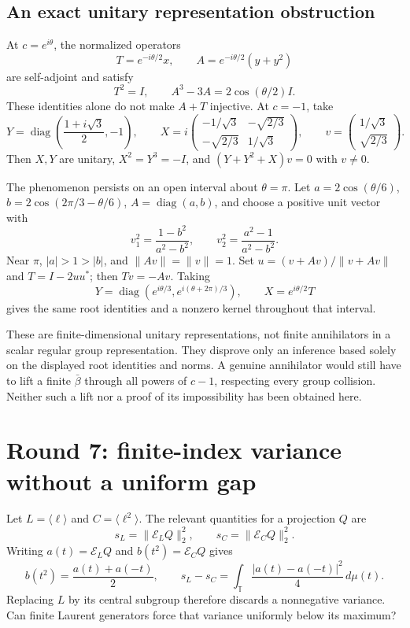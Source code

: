 \documentclass[11pt,a4paper,oneside]{report}
\theoremstyle{definition}
\theoremstyle{remark}
\DeclareMathOperator{\diag}{diag}
\newcommand{\T}{\mathbb T}
\begin{document}
\subsection{An exact unitary representation obstruction}
At $c=e^{i\theta}$, the normalized operators
\[
T=e^{-i\theta/2}x,\qquad
A=e^{-i\theta/2}(y+y^2)
\]
are self-adjoint and satisfy
\[
T^2=I,\qquad A^3-3A=2\cos(\theta/2)I.
\]
These identities alone do not make $A+T$ injective. At $c=-1$,
take
\[
Y=\diag\left(\frac{1+i\sqrt3}{2},-1\right),\qquad
X=i\begin{pmatrix}-1/\sqrt3&-\sqrt{2/3}\\
-\sqrt{2/3}&1/\sqrt3\end{pmatrix},\qquad
v=\begin{pmatrix}1/\sqrt3\\\sqrt{2/3}\end{pmatrix}.
\]
Then $X,Y$ are unitary, $X^2=Y^3=-I$, and
$(Y+Y^2+X)v=0$ with $v\ne0$.

The phenomenon persists on an open interval about $\theta=\pi$.
Let $a=2\cos(\theta/6)$, $b=2\cos(2\pi/3-\theta/6)$,
$A=\diag(a,b)$, and choose a positive unit vector with
\[
v_1^2=\frac{1-b^2}{a^2-b^2},\qquad
v_2^2=\frac{a^2-1}{a^2-b^2}.
\]
Near $\pi$, $|a|>1>|b|$, and $\|Av\|=\|v\|=1$.
Set $u=(v+Av)/\|v+Av\|$ and $T=I-2uu^*$; then $Tv=-Av$.
Taking
\[
Y=\diag(e^{i\theta/3},e^{i(\theta+2\pi)/3}),\qquad
X=e^{i\theta/2}T
\]
gives the same root identities and a nonzero kernel throughout
that interval.

These are finite-dimensional unitary representations, not finite
annihilators in a scalar regular group representation. They disprove
only an inference based solely on the displayed root identities and
norms. A genuine annihilator would still have to lift a finite
$\bar\beta$ through all powers of $c-1$, respecting every group
collision. Neither such a lift nor a proof of its impossibility
has been obtained here.

\section{Round 7: finite-index variance without a uniform gap}
Let $L=\langle\ell\rangle$ and $C=\langle\ell^2\rangle$.
The relevant quantities for a projection $Q$ are
\[
s_L=\|\mathcal E_LQ\|_2^2,\qquad
s_C=\|\mathcal E_CQ\|_2^2.
\]
Writing $a(t)=\mathcal E_LQ$ and $b(t^2)=\mathcal E_CQ$ gives
\[
b(t^2)=\frac{a(t)+a(-t)}2,\qquad
s_L-s_C=\int_\T\frac{|a(t)-a(-t)|^2}{4}\,d\mu(t).
\]
Replacing $L$ by its central subgroup therefore discards a
nonnegative variance. Can finite Laurent generators force that
variance uniformly below its maximum?
\end{document}
